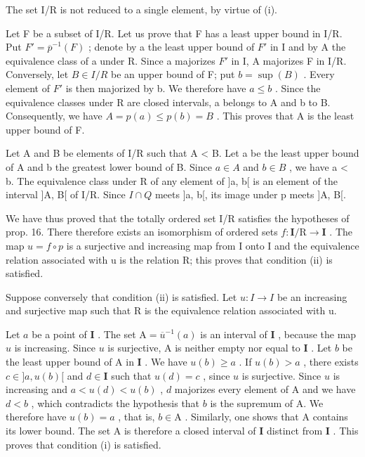 The set I/R is not reduced to a single element, by virtue of (i).

Let F be a subset of I/R. Let us prove that F has a least upper bound in I/R. Put \(F' = \overline{p}^{-1}(F)\) ; denote by a the least upper bound of \(F'\) in I and by A the equivalence class of a under R. Since a majorizes \(F'\) in I, A majorizes F in I/R. Conversely, let \(B \in I/R\) be an upper bound of F; put \(b = \sup(B)\) . Every element of \(F'\) is then majorized by b. We therefore have \(a \leqslant b\) . Since the equivalence classes under R are closed intervals, a belongs to A and b to B. Consequently, we have \(A = p(a) \leqslant p(b) = B\) . This proves that A is the least upper bound of F.

Let A and B be elements of I/R such that A \textless{} B. Let a be the least upper bound of A and b the greatest lower bound of B. Since \(a \in A\) and \(b \in B\) , we have a \textless{} b. The equivalence class under R of any element of {]}a, b{[} is an element of the interval {]}A, B{[} of I/R. Since \(I \cap Q\) meets {]}a, b{[}, its image under p meets {]}A, B{[}.

We have thus proved that the totally ordered set I/R satisfies the hypotheses of prop. 16. There therefore exists an isomorphism of ordered sets \(f \colon \mathbf{I} / \mathrm{R} \to \mathbf{I}\) . The map \(u = f \circ p\) is a surjective and increasing map from I onto I and the equivalence relation associated with u is the relation R; this proves that condition (ii) is satisfied.

Suppose conversely that condition (ii) is satisfied. Let \(u: I \rightarrow I\) be an increasing and surjective map such that R is the equivalence relation associated with u.

Let \(a\) be a point of \(\mathbf{I}\) . The set \(\mathrm{A} = \overline{u}^{-1}(a)\) is an interval of \(\mathbf{I}\) , because the map \(u\) is increasing. Since \(u\) is surjective, A is neither empty nor equal to \(\mathbf{I}\) . Let \(b\) be the least upper bound of A in \(\mathbf{I}\) . We have \(u(b) \geqslant a\) . If \(u(b) > a\) , there exists \(c \in ]a, u(b)[\) and \(d \in \mathbf{I}\) such that \(u(d) = c\) , since \(u\) is surjective. Since \(u\) is increasing and \(a < u(d) < u(b)\) , \(d\) majorizes every element of A and we have \(d < b\) , which contradicts the hypothesis that \(b\) is the supremum of A. We therefore have \(u(b) = a\) , that is, \(b \in \mathrm{A}\) . Similarly, one shows that A contains its lower bound. The set A is therefore a closed interval of \(\mathbf{I}\) distinct from \(\mathbf{I}\) . This proves that condition (i) is satisfied.

